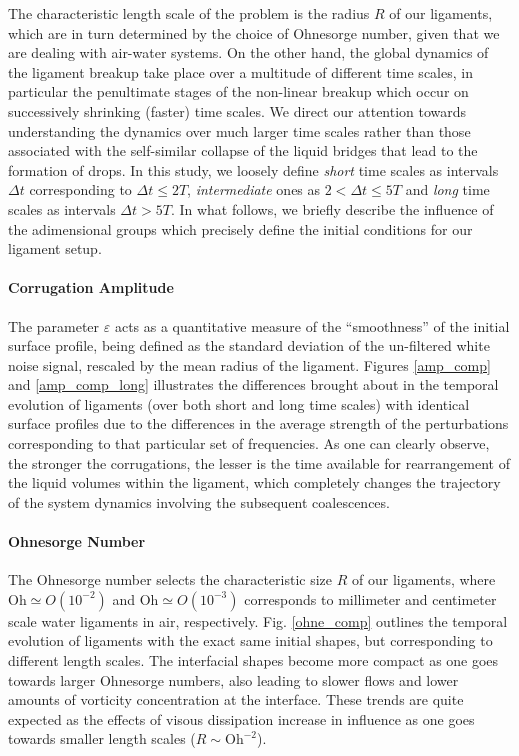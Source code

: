 The characteristic length scale of the problem is the radius $R$ of our ligaments, 
which are in turn determined by the choice of Ohnesorge number, given that we are dealing with air-water systems.
On the other hand, the global dynamics of the ligament breakup take place over a multitude of different time scales, 
in particular the penultimate stages of the non-linear breakup which occur on successively shrinking (faster) time scales.  
We direct our attention towards understanding the dynamics over much larger time scales rather than those  
associated with the self-similar collapse of the liquid bridges that lead to the formation of drops. 
In this study, we loosely define \textit{short} time scales as intervals $\Delta t$ corresponding 
to $ \Delta t \leq 2T $, \textit{intermediate} ones as $ 2 < \Delta t \leq 5T $ 
and \textit{long} time scales as intervals $\Delta t > 5T$. 
In what follows, we briefly describe the influence of the adimensional 
groups which precisely define the initial conditions for our ligament setup.  


\paragraph{Corrugation Amplitude}
The parameter $\varepsilon$ acts as a quantitative measure of the ``smoothness'' 
of the initial surface profile, being defined as the standard deviation 
of the un-filtered white noise signal, rescaled by the mean radius of the ligament.
Figures \ref{amp_comp} and \ref{amp_comp_long} illustrates the differences brought about in the temporal
evolution of ligaments (over both short and long time scales) with identical surface profiles 
due to the differences in the average strength of the perturbations corresponding to that particular set of frequencies. 
As one can clearly observe, the stronger the corrugations, 
the lesser is the time available for rearrangement of the liquid 
volumes within the ligament, which completely changes the trajectory of 
the system dynamics involving the subsequent coalescences.    

\paragraph{Ohnesorge Number}
The Ohnesorge number selects the characteristic size $R$ of our ligaments, 
where $\textrm{Oh} \simeq O(10^{-2})$ and $\textrm{Oh} \simeq O(10^{-3})$ corresponds to 
millimeter and centimeter scale water ligaments in air, respectively.  
Fig. \ref{ohne_comp} outlines the temporal evolution of ligaments with   
the exact same initial shapes, but corresponding to different length scales. 
The interfacial shapes become more compact as one goes towards larger Ohnesorge
numbers, also leading to slower flows and lower amounts of vorticity concentration at the interface.  
These trends are quite expected as the effects of visous dissipation increase in influence
as one goes towards smaller length scales ($R \sim \textrm{Oh}^{-2}$).

